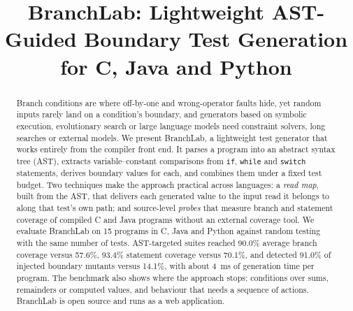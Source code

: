 \documentclass[conference]{IEEEtran}
\begin{document}
\title{BranchLab: Lightweight AST-Guided Boundary Test Generation for C, Java and Python}

\author{
\and
{}
}

\maketitle

\begin{abstract}
Branch conditions are where off-by-one and wrong-operator faults hide, yet random inputs rarely land on a
condition's boundary, and generators based on symbolic execution, evolutionary search or large language models
need constraint solvers, long searches or external models. We present BranchLab, a lightweight test generator
that works entirely from the compiler front end. It parses a program into an abstract syntax tree (AST),
extracts variable--constant comparisons from \texttt{if}, \texttt{while} and \texttt{switch} statements, derives
boundary values for each, and combines them under a fixed test budget. Two techniques make the approach
practical across languages: a \emph{read map}, built from the AST, that delivers each generated value to the
input read it belongs to along that test's own path; and source-level \emph{probes} that measure branch and
statement coverage of compiled C and Java programs without an external coverage tool. We evaluate BranchLab on
15 programs in C, Java and Python against random testing with the same number of tests. AST-targeted suites
reached 90.0\% average branch coverage versus 57.6\%, 93.4\% statement coverage versus 70.1\%, and
detected 91.0\% of injected boundary mutants versus 14.1\%, with about 4~ms of generation time per
program. The benchmark also shows where the approach stops: conditions over sums, remainders or computed
values, and behaviour that needs a sequence of actions. BranchLab is open source and runs as a web application.
\end{abstract}
\end{document}
